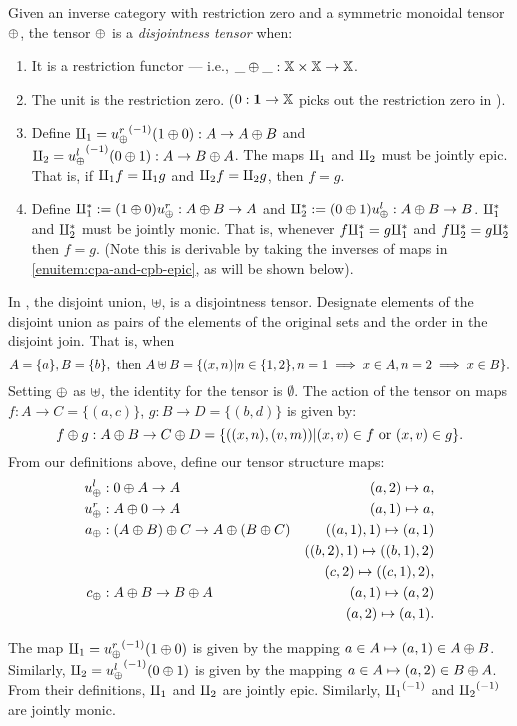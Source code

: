 \begin{definition}\label{def:disjointness_tensor}
  Given an inverse category \X with restriction zero and a symmetric monoidal tensor
  $\oplus$, the tensor $\oplus$ is a \emph{disjointness tensor} when:
  \begin{enumerate}[{(}i{)}]
    \item It is a restriction functor --- i.e., $\_ \oplus \_ : \mathbb{X} \times \mathbb{X} \to \mathbb{X}$.
    \item The unit is the restriction zero. ($0 : \boldsymbol{1}\to \mathbb{X}$ picks out the restriction
    zero in \X).
    \item Define $\amalg_{1} = {u_{\oplus}^r}^{(-1)}(1\oplus0):A\to A\oplus B$ and $\amalg_{2} = {u_{\oplus}^l}^{(-1)}(0\oplus1): A\to B\oplus A$.
      The maps $\amalg_{1}$ and $\amalg_{2}$ must be jointly epic. That is, if $\amalg_{1} f = \amalg_{1} g$ and $\amalg_{2} f = \amalg_{2} g$, then
      $f = g$.\label{enuitem:cpa-and-cpb-epic}
    \item Define $\amalg_{1}^{*} := (1\oplus0)u_{\oplus}^r: A\oplus B \to A$ and $\amalg_{2}^{*} := (0\oplus1)u_{\oplus}^l:A\oplus B \to B$.
      $\amalg_{1}^{*}$  and $\amalg_{2}^{*}$ must be jointly monic. That is, whenever $f\amalg_{1}^{*} = g \amalg_{1}^{*}$ and
      $f\amalg_{2}^{*} = g\amalg_{2}^{*}$ then $f = g$. (Note this is derivable by taking the inverses of maps in
      \ref{enuitem:cpa-and-cpb-epic}, as will be shown below).
  \end{enumerate}
\end{definition}

\begin{example}\label{ex:pinj_has_disjointness_tensor}
  In \pinj, the disjoint union, $\uplus$, is a disjointness tensor. Designate elements of
  the disjoint union as pairs of the elements of the original sets and the order in the disjoint
  join. That is, when
  \[
     A=\{a\}, B=\{b\}, \text{ then } A\uplus B = \{(x,n) | n\in\{1,2\},n =1 \implies x \in A, n = 2
     \implies x\in B\}.
  \]
  Setting $\oplus$ as $\uplus$, the identity for the tensor is $\emptyset$. The action
  of the tensor on maps $f:A\to C = \{(a,c)\}$, $g:B\to D = \{(b,d)\}$ is given by:
  \[
    f\oplus g:A\oplus B\to C\oplus D = \{((x,n),(v,m)) | (x,v)\in f \text{ or } (x,v) \in g\}.
  \]
  From our definitions above, define our tensor structure maps:
  \begin{align*}
    u_{\oplus}^l &:0\oplus A \to A &(a,2) \mapsto a,\\
    u_{\oplus}^r &:A\oplus0 \to A &(a,1) \mapsto a,\\
    a_\oplus &: (A\oplus B)\oplus C \to A\oplus(B\oplus C)&((a,1),1) \mapsto (a,1)\\
     &  &((b,2),1) \mapsto ((b,1),2)\\
     &  &(c,2) \mapsto ((c,1),2),\\
    c_\oplus &: A\oplus B \to B\oplus A & (a,1) \mapsto (a,2)\\
    & & (a,2) \mapsto (a,1).
  \end{align*}

  The map $\amalg_{1} = {u_{\oplus}^r}^{(-1)}(1\oplus0)$ is given by the mapping $a\in A\mapsto (a,1) \in
  A\oplus B$. Similarly, $\amalg_{2} = {u_{\oplus}^l}^{(-1)}(0\oplus1)$ is given by the mapping $a\in A\mapsto (a,2) \in
  B\oplus A$. From their definitions, $\amalg_{1}$ and $\amalg_{2}$ are jointly epic. Similarly, ${\amalg_{1}}^{(-1)}$ and ${\amalg_{2}}^{(-1)}$ are
  jointly monic.
\end{example}

